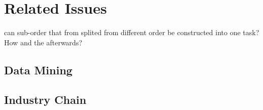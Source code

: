 \section{Related Issues} %
\label{sec:problem}

can sub-order that from splited from different order be constructed into one task? How and the afterwards?

\subsection{Data Mining} %
\label{sub:data_mining}


\subsection{Industry Chain} %
\label{sub:industry_chain}

